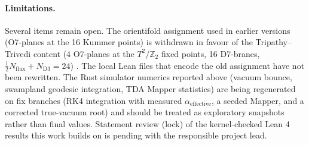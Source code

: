 \documentclass[11pt,a4paper]{article}
\begin{document}
\paragraph{Limitations.} Several items remain open. The orientifold assignment used in earlier versions (O7-planes at the 16 Kummer points) is withdrawn in favour of the Tripathy--Trivedi content (4 O7-planes at the $T^2/\mathbb{Z}_2$ fixed points, 16 D7-branes, $\tfrac12 N_{\text{flux}} + N_{\text{D3}} = 24$) \cite{tripathy2003, berkooz1996}. The local Lean files that encode the old assignment have not been rewritten. The Rust simulator numerics reported above (vacuum bounce, swampland geodesic integration, TDA Mapper statistics) are being regenerated on fix branches (RK4 integration with measured $\alpha_{\text{effective}}$, a seeded Mapper, and a corrected true-vacuum root) and should be treated as exploratory snapshots rather than final values. Statement review (lock) of the kernel-checked Lean 4 results this work builds on is pending with the responsible project lead.
\end{document}
